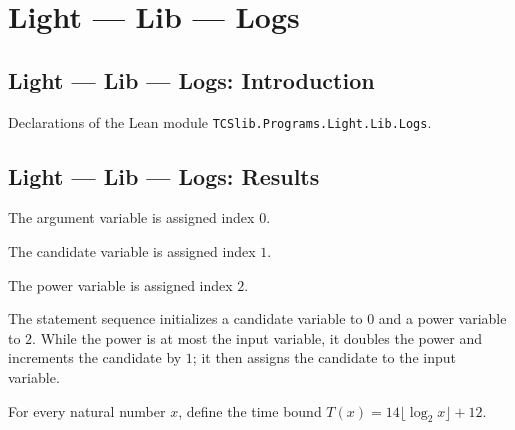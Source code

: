 \section{Light --- Lib --- Logs}
\subsection*{Light --- Lib --- Logs: Introduction}

Declarations of the Lean module \texttt{TCSlib.Programs.Light.Lib.Logs}.

\subsection*{Light --- Lib --- Logs: Results}

\begin{definition}
\label{Light.Logs.Arg}
\leanok
The argument variable is assigned index $0$.
\end{definition}

\begin{definition}
\label{Light.Logs.Cand}
\leanok
{}
The candidate variable is assigned index $1$.
\end{definition}

\begin{definition}
\label{Light.Logs.Power}
\leanok
{}
The power variable is assigned index $2$.
\end{definition}

\begin{definition}
\label{Light.log2Body}
\leanok
{}
The statement sequence initializes a candidate variable to $0$ and a power variable to
$2$. While the power is at most the input variable, it doubles the power and increments
the candidate by $1$; it then assigns the candidate to the input variable.
\end{definition}

\begin{definition}
\label{Light.log2Time}
\leanok
For every natural number $x$, define the time bound $T(x)=14\lfloor\log_2 x\rfloor+12$.
\end{definition}

